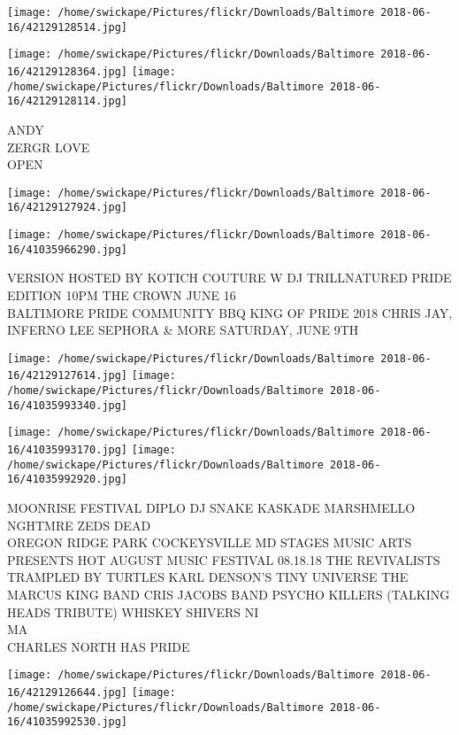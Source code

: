 \documentclass[10pt,letterpaper]{article}
\begin{document}
\texttt{[image: /home/swickape/Pictures/flickr/Downloads/Baltimore 2018-06-16/42129128514.jpg]}

\vspace{0.25in}
\texttt{[image: /home/swickape/Pictures/flickr/Downloads/Baltimore 2018-06-16/42129128364.jpg]}
\texttt{[image: /home/swickape/Pictures/flickr/Downloads/Baltimore 2018-06-16/42129128114.jpg]}

ANDY\\
ZERGR LOVE\\
OPEN\\
\pagebreak

\texttt{[image: /home/swickape/Pictures/flickr/Downloads/Baltimore 2018-06-16/42129127924.jpg]}

\vspace{0.25in}
\texttt{[image: /home/swickape/Pictures/flickr/Downloads/Baltimore 2018-06-16/41035966290.jpg]}

VERSION HOSTED BY KOTICH COUTURE W DJ TRILLNATURED PRIDE EDITION 10PM THE CROWN JUNE 16\\
BALTIMORE PRIDE COMMUNITY BBQ KING OF PRIDE 2018 CHRIS JAY, INFERNO LEE SEPHORA \& MORE SATURDAY, JUNE 9TH\\
\pagebreak

\texttt{[image: /home/swickape/Pictures/flickr/Downloads/Baltimore 2018-06-16/42129127614.jpg]}
\texttt{[image: /home/swickape/Pictures/flickr/Downloads/Baltimore 2018-06-16/41035993340.jpg]}

\texttt{[image: /home/swickape/Pictures/flickr/Downloads/Baltimore 2018-06-16/41035993170.jpg]}
\texttt{[image: /home/swickape/Pictures/flickr/Downloads/Baltimore 2018-06-16/41035992920.jpg]}

MOONRISE FESTIVAL DIPLO DJ SNAKE KASKADE MARSHMELLO NGHTMRE ZEDS DEAD\\
OREGON RIDGE PARK COCKEYSVILLE MD STAGES MUSIC ARTS PRESENTS HOT AUGUST MUSIC FESTIVAL 08.18.18 THE REVIVALISTS TRAMPLED BY TURTLES KARL DENSON'S TINY UNIVERSE THE MARCUS KING BAND CRIS JACOBS BAND PSYCHO KILLERS (TALKING HEADS TRIBUTE) WHISKEY SHIVERS NI\\
MA\\
CHARLES NORTH HAS PRIDE\\
\pagebreak

\texttt{[image: /home/swickape/Pictures/flickr/Downloads/Baltimore 2018-06-16/42129126644.jpg]}
\texttt{[image: /home/swickape/Pictures/flickr/Downloads/Baltimore 2018-06-16/41035992530.jpg]}
\end{document}
